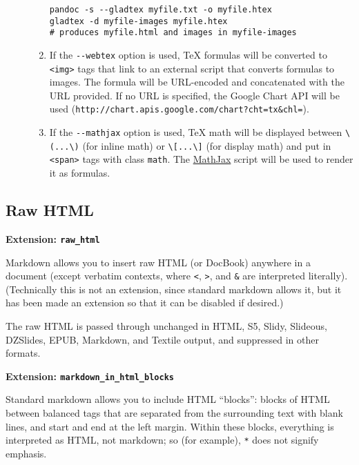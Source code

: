\documentclass[]{article}
\begin{document}
\begin{description}
\begin{enumerate}[1.]
\begin{verbatim}
pandoc -s --gladtex myfile.txt -o myfile.htex
gladtex -d myfile-images myfile.htex
# produces myfile.html and images in myfile-images
\end{verbatim}
\item
  If the \texttt{-{}-webtex} option is used, TeX formulas will be
  converted to \texttt{\textless{}img\textgreater{}} tags that link to
  an external script that converts formulas to images. The formula will
  be URL-encoded and concatenated with the URL provided. If no URL is
  specified, the Google Chart API will be used
  (\texttt{http://chart.apis.google.com/chart?cht=tx\&chl=}).
\item
  If the \texttt{-{}-mathjax} option is used, TeX math will be displayed
  between \texttt{\textbackslash{}(...\textbackslash{})} (for inline
  math) or \texttt{\textbackslash{}{[}...\textbackslash{}{]}} (for
  display math) and put in \texttt{\textless{}span\textgreater{}} tags
  with class \texttt{math}. The \href{http://www.mathjax.org/}{MathJax}
  script will be used to render it as formulas.
\end{enumerate}
\end{description}

\subsection{Raw HTML}

\textbf{Extension: \texttt{raw\_html}}

Markdown allows you to insert raw HTML (or DocBook) anywhere in a
document (except verbatim contexts, where \texttt{\textless{}},
\texttt{\textgreater{}}, and \texttt{\&} are interpreted literally).
(Technically this is not an extension, since standard markdown allows
it, but it has been made an extension so that it can be disabled if
desired.)

The raw HTML is passed through unchanged in HTML, S5, Slidy, Slideous,
DZSlides, EPUB, Markdown, and Textile output, and suppressed in other
formats.

\textbf{Extension: \texttt{markdown\_in\_html\_blocks}}

Standard markdown allows you to include HTML ``blocks'': blocks of HTML
between balanced tags that are separated from the surrounding text with
blank lines, and start and end at the left margin. Within these blocks,
everything is interpreted as HTML, not markdown; so (for example),
\texttt{*} does not signify emphasis.
\end{document}
